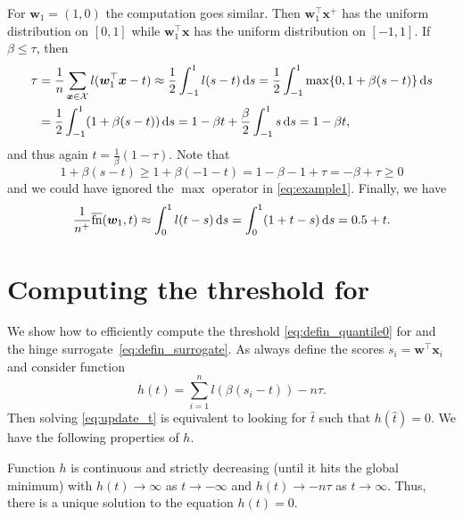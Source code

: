 For $\bm{w}_1=(1,0)$ the computation goes similar. Then $\bm{w}_1^\top \bm{x}^+$ has the uniform distribution on $[0,1]$ while $\bm{w}_1^\top \bm{x}$ has the uniform distribution on $[-1,1]$. If $\beta\le\tau$, then
\begin{equation}\label{eq:example1}
  \begin{aligned}
    \tau
    & = \frac{1}{n}\sum_{\bm{x} \in \mathcal{X}}l(\bm{w}_1^\top \bm{x}-t)
    \approx \frac{1}{2}\int_{-1}^1 l(s-t)\mathop{}\!\mathrm{d}s
      = \frac{1}{2}\int_{-1}^1 \max\{0,1+\beta(s-t)\}\mathop{}\!\mathrm{d}s \\
    & =\frac{1}{2}\int_{-1}^1 (1+\beta(s - t))\mathop{}\!\mathrm{d}s
      = 1 - \beta t + \frac{\beta}{2}\int_{-1}^1s\mathop{}\!\mathrm{d}s
      = 1 - \beta t,
  \end{aligned}
\end{equation}
and thus again $t=\frac{1}{\beta}(1-\tau)$. Note that
\begin{equation*}
  1+\beta(s-t) \ge 1+\beta(-1-t) = 1-\beta - 1+\tau = -\beta+\tau \ge0
\end{equation*}
and we could have ignored the $\max$ operator in \eqref{eq:example1}. Finally, we have
\begin{equation*}
  \frac{1}{n^+}\overline{\textnormal{fn}}(\bm{w}_1,t)
  \approx \int_0^1 l(t-s)\mathop{}\!\mathrm{d}s
  = \int_0^1 (1 + t - s)\mathop{}\!\mathrm{d}s
  = 0.5 + t.
\end{equation*}

\section{Computing the threshold for \PatMat}\label{app:threshold}

We show how to efficiently compute the threshold \eqref{eq:defin_quantile0} for \PatMat and the hinge surrogate~\eqref{eq:defin_surrogate}. As always define the scores $s_i=\bm{w}^\top \bm{x}_i$ and consider function
\begin{equation}\label{eq:defin_h}
  h(t) = \sum_{i=1}^nl(\beta(s_i-t)) - n\tau.
\end{equation}
Then solving \eqref{eq:update_t} is equivalent to looking for $\hat{t}$ such that $h(\hat{t})=0$. We have the following properties of $h$.

\begin{lemma}
  Function $h$ is continuous and strictly decreasing (until it hits the global minimum) with $h(t)\to \infty$ as $t\to-\infty$ and $h(t)\to -n\tau$ as $t\to\infty$. Thus, there is a unique solution to the equation $h(t)=0$.
\end{lemma}

